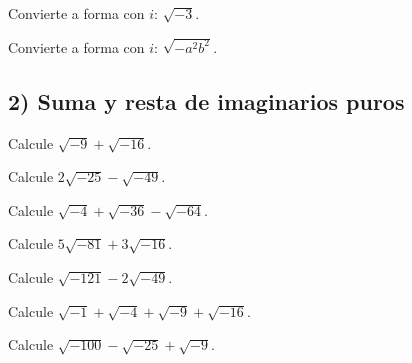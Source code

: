 \begin{ejercicio}
Convierte a forma con $i$: $\displaystyle \sqrt{-3}$.
\end{ejercicio}

\begin{ejercicio}
Convierte a forma con $i$: $\displaystyle \sqrt{-a^{2}b^{2}}$.
\end{ejercicio}


\subsection{2) Suma y resta de imaginarios puros}

\begin{ejercicio}
Calcule $\displaystyle \sqrt{-9}+\sqrt{-16}$.
\end{ejercicio}

\begin{ejercicio}
Calcule $\displaystyle 2\sqrt{-25}-\sqrt{-49}$.
\end{ejercicio}

\begin{ejercicio}
Calcule $\displaystyle \sqrt{-4}+\sqrt{-36}-\sqrt{-64}$.
\end{ejercicio}

\begin{ejercicio}
Calcule $\displaystyle 5\sqrt{-81}+3\sqrt{-16}$.
\end{ejercicio}

\begin{ejercicio}
Calcule $\displaystyle \sqrt{-121}-2\sqrt{-49}$.
\end{ejercicio}

\begin{ejercicio}
Calcule $\displaystyle \sqrt{-1}+\sqrt{-4}+\sqrt{-9}+\sqrt{-16}$.
\end{ejercicio}

\begin{ejercicio}
Calcule $\displaystyle \sqrt{-100}-\sqrt{-25}+\sqrt{-9}$.
\end{ejercicio}


